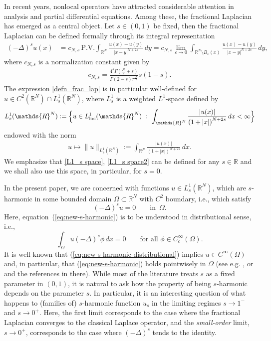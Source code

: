 \documentclass[notitlepage,11pt,reqno]{amsart}
\theoremstyle{definition}
\numberwithin{equation}{section}
\newcommand{\loc}{\mathrm{loc}}
\newcommand{\RRN}{\mathds{R}^{N}}
\newcommand{\RR}{\mathds{R}}
\begin{document}
In recent years, nonlocal operators have attracted considerable attention in analysis and partial differential equations. Among these, the fractional Laplacian has emerged as a central object. Let $s\in (0, 1)$ be fixed, then the fractional Laplacian can be defined formally through its integral representation
\begin{align}\label{defn_frac_lap}
(-\Delta)^s u(x) &= c_{N, s}\, \text{P.V.}\int_{\RR^N} \frac{u(x)-u(y)}{|x-y|^{N+2s}} \, dy=c_{N, s} \lim_{\varepsilon \to 0}\int_{\RR^N\setminus B_{\varepsilon}(x)}\frac{u(x)-u(y)}{|x-y|^{N+2s}}\, dy,
\end{align}
where $c_{N, s}$ is a normalization constant given by
\begin{align}\label{defn_c(N, s)}
    c_{N, s}=\frac{4^s\Gamma\left(\frac{N}{2}+s\right)}{\Gamma(2-s)\pi^{\frac{N}{2}}}s(1-s).
\end{align}
The expression \eqref{defn_frac_lap} is in particular well-defined for $u\in C^{2}(\RR^N)\cap L^1_{s}(\RR^N)$, where $L^1_s$ is a weighted $L^1$-space defined by
\begin{align}\label{L1_s space}
L^1_s(\RR^N):=\Bigl\{u \in L^1_{\loc}(\RR^N)\,\, :\,\, \int_{\RR^N}\frac{|u(x)|}{\left(1+|x|\right)^{N+2s}}\, dx<\infty \Bigr\}
\end{align}
endowed with the norm
\begin{align}\label{L1_s space2}
u \mapsto    \|u\|_{L^1_s(\RR^N)}:=\int_{\RR^N}\frac{|u(x)|}{\left(1+|x|\right)^{N+2s}}\, dx.
\end{align}
We emphasize that \eqref{L1_s space}, \eqref{L1_s space2} can be defined for any $s\in \RR$ and we shall also use this space, in particular, for $s=0$.

In the present paper, we are concerned with functions $u \in L^1_{s}(\RR^N)$, which are $s$-harmonic in some bounded domain $\Omega \subset \RRN$ with $C^2$ boundary, i.e., which satisfy
\begin{equation}
  \label{eq:new-s-harmonic}
 (-\Delta)^s u =0 \qquad \text{in}\,\,\, \Omega.  
\end{equation}
Here, equation~(\ref{eq:new-s-harmonic}) is to be understood in distributional sense, i.e.,
\begin{equation}
  \label{eq:new-s-harmonic-distributional}
\int_{\Omega}u (-\Delta)^s\phi\,dx  =0 \qquad \text{for all $\phi \in C^\infty_c(\Omega)$.}
\end{equation}
It is well known  that (\ref{eq:new-s-harmonic-distributional}) implies $u \in C^\infty(\Omega)$  and, in particular, that (\ref{eq:new-s-harmonic}) holds pointwisely in $\Omega$ (see e.g. \cite[Chapter I.6]{L72}, \cite{BB99} or \cite[Theorem 12.17]{Nicola17} and the references in there). While most of the literature treats $s$ as a fixed parameter in $(0, 1)$, it is  natural to ask how the property of being $s$-harmonic depends on the parameter $s$. In particular, it is an interesting question of what happens to (families of) $s$-harmonic function $u_s$ in the limiting regimes $s \to 1^-$ and $s\to 0^+$. Here, the first limit corresponds to the case where the fractional Laplacian converges to the classical Laplace operator, and the \textit{small-order} limit, $s \to 0^+$, corresponds to the case where $(-\Delta)^s$ tends to the identity.
\end{document}
